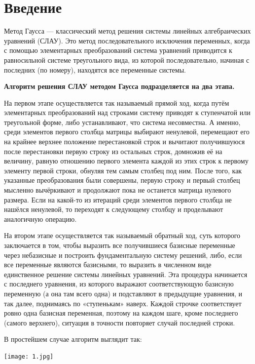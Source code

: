 \documentclass[12pt,a4paper]{scrartcl}
\begin{document}
\section{Введение}
\label{sec:intro}

Метод Гаусса — классический метод решения системы линейных алгебраических уравнений (СЛАУ). Это метод последовательного исключения переменных, когда с помощью элементарных преобразований система уравнений приводится к равносильной системе треугольного вида, из которой последовательно, начиная с последних (по номеру), находятся все переменные системы.

{\vspace {0.25cm} \bf Алгоритм решения СЛАУ методом Гаусса подразделяется на два этапа.}

\vspace {0.25cm} На первом этапе осуществляется так называемый прямой ход, когда путём элементарных преобразований над строками систему приводят к ступенчатой или треугольной форме, либо устанавливают, что система несовместна. А именно, среди элементов первого столбца матрицы выбирают ненулевой, перемещают его на крайнее верхнее положение перестановкой строк и вычитают получившуюся после перестановки первую строку из остальных строк, домножив её на величину, равную отношению первого элемента каждой из этих строк к первому элементу первой строки, обнуляя тем самым столбец под ним. После того, как указанные преобразования были совершены, первую строку и первый столбец мысленно вычёркивают и продолжают пока не останется матрица нулевого размера. Если на какой-то из итераций среди элементов первого столбца не нашёлся ненулевой, то переходят к следующему столбцу и проделывают аналогичную операцию.

На втором этапе осуществляется так называемый обратный ход, суть которого заключается в том, чтобы выразить все получившиеся базисные переменные через небазисные и построить фундаментальную систему решений, либо, если все переменные являются базисными, то выразить в численном виде единственное решение системы линейных уравнений. Эта процедура начинается с последнего уравнения, из которого выражают соответствующую базисную переменную (а она там всего одна) и подставляют в предыдущие уравнения, и так далее, поднимаясь по «ступенькам» наверх. Каждой строчке соответствует ровно одна базисная переменная, поэтому на каждом шаге, кроме последнего (самого верхнего), ситуация в точности повторяет случай последней строки.

В простейшем случае алгоритм выглядит так:
\begin{center}
\texttt{[image: 1.jpg]}
\end{center}
\end{document}
